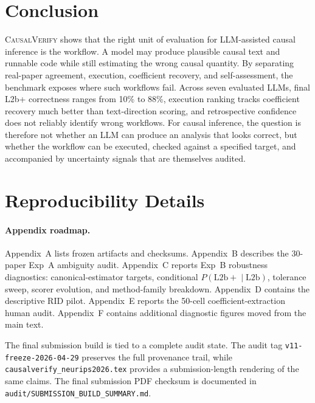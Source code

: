 \documentclass{article}
\begin{document}
\section{Conclusion}

\textsc{CausalVerify} shows that the right unit of evaluation for
LLM-assisted causal inference is the workflow. A model may produce
plausible causal text and runnable code while still estimating the wrong
causal quantity. By separating real-paper agreement, execution,
coefficient recovery, and self-assessment, the benchmark exposes where
such workflows fail. Across seven evaluated LLMs, final L2b+ correctness
ranges from 10\% to 88\%, execution ranking tracks coefficient recovery
much better than text-direction scoring, and retrospective confidence
does not reliably identify wrong workflows. For causal inference, the
question is therefore not whether an LLM can produce an analysis that
looks correct, but whether the workflow can be executed, checked against
a specified target, and accompanied by uncertainty signals that are
themselves audited.

\clearpage
{}
\label{sec:references-start}



\clearpage
\appendix

\section{Reproducibility Details}
\label{app:reproducibility}

\paragraph{Appendix roadmap.}
Appendix~A lists frozen artifacts and checksums. Appendix~B describes the
30-paper Exp~A ambiguity audit. Appendix~C reports Exp~B robustness
diagnostics: canonical-estimator targets, conditional
$P(\mathrm{L2b+}\mid\mathrm{L2b})$, tolerance sweep, scorer evolution, and
method-family breakdown. Appendix~D
contains the descriptive RID pilot. Appendix~E reports the 50-cell
coefficient-extraction human audit. Appendix~F contains additional
diagnostic figures moved from the main text.

The final submission build is tied to a complete audit state. The audit tag
\texttt{v11-freeze-2026-04-29} preserves the full provenance trail, while
\texttt{causalverify\_neurips2026.tex} provides a submission-length rendering
of the same claims. The final submission PDF checksum is documented in
\texttt{audit/SUBMISSION\_BUILD\_SUMMARY.md}.
\end{document}
